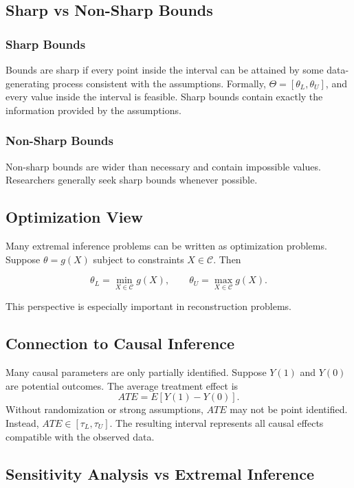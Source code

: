 \documentclass[11pt]{article}
\begin{document}
\subsection*{Sharp vs Non-Sharp Bounds}

\subsubsection*{Sharp Bounds}

Bounds are sharp if every point inside the interval can be attained by some data-generating process consistent with the assumptions.
Formally, $\Theta=[\theta_L,\theta_U]$, and every value inside the interval is feasible.
Sharp bounds contain exactly the information provided by the assumptions.

\subsubsection*{Non-Sharp Bounds}

Non-sharp bounds are wider than necessary and contain impossible values.
Researchers generally seek sharp bounds whenever possible.

\subsection*{Optimization View}

Many extremal inference problems can be written as optimization problems.
Suppose $\theta=g(X)$ subject to constraints $X\in\mathcal C$. Then

\[\theta_L=\min_{X\in\mathcal C}g(X),\qquad \theta_U=\max_{X\in\mathcal C}g(X).\]

This perspective is especially important in reconstruction problems.

\subsection*{Connection to Causal Inference}

Many causal parameters are only partially identified.
Suppose $Y(1)$ and $Y(0)$ are potential outcomes. The average treatment effect is
\[ATE=E[Y(1)-Y(0)].\]
Without randomization or strong assumptions, $ATE$ may not be point identified. Instead, $ATE\in[\tau_L,\tau_U]$.
The resulting interval represents all causal effects compatible with the observed data.

\subsection*{Sensitivity Analysis vs Extremal Inference}
\end{document}
